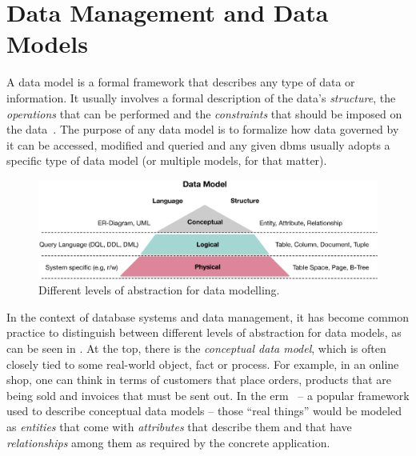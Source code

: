 \section{Data Management and Data Models}

\label{section:data_model}

A data model is a formal framework that describes any type of data or information. It usually involves a formal description of the data's \emph{structure}, the \emph{operations} that can be performed and the \emph{constraints} that should be imposed on the data~\cite{Garcia:2009Database}. The purpose of any data model is to formalize how data governed by it can be accessed, modified and queried and any given \acrshort{dbms} usually adopts a specific type of data model (or multiple models, for that matter).


\begin{figure}[b]
    \centering
    \includegraphics[width=\textwidth]{figures/datamodel_hierarchy.eps}
    \caption{Different levels of abstraction for data modelling.}
    \label{figure:datamodel_hierarchy}
\end{figure}

In the context of database systems and data management, it has become common practice to distinguish between different levels of abstraction for data models, as can be seen in . At the top, there is the \emph{conceptual data model}, which is often closely tied to some real-world object, fact or process. For example, in an online shop, one can think in terms of customers that place orders, products that are being sold and invoices that must be sent out. In the \acrfull{erm}~\cite{Chen:1976The} -- a popular framework used to describe conceptual data models -- those ``real things'' would be modeled as \emph{entities} that come with \emph{attributes} that describe them and that have \emph{relationships} among them as required by the concrete application.

